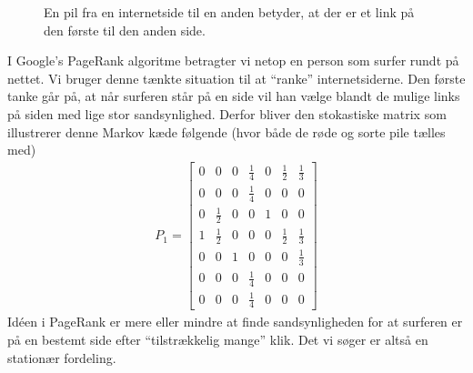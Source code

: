 \documentclass[10pt,a4paper]{article}
\begin{document}
\begin{figure}[h!]
\centering
{}
\caption{En pil fra en internetside til en anden betyder, at der er et link på den første til den anden side.}
\label{fig:links}
\end{figure}

I Google's PageRank algoritme betragter vi netop en person som surfer rundt på nettet. Vi bruger denne tænkte situation til at ``ranke'' internetsiderne. Den første tanke går på, at når surferen står på en side vil han vælge blandt de mulige links på siden med lige stor sandsynlighed. Derfor bliver den stokastiske matrix som illustrerer denne Markov kæde følgende (hvor både de røde og sorte pile tælles med)
\begin{align}\label{eq:Overgangsmatrix}
	P_1=\begin{bmatrix}
		0 & 0 & 0 & \frac{1}{4} & 0 & \frac{1}{2} & \frac{1}{3}\\
		0 & 0 & 0 & \frac{1}{4} & 0 & 0 & 0 \\
		0 & \frac{1}{2} & 0 & 0 & 1 & 0 & 0 \\
		1 & \frac{1}{2} & 0 & 0 & 0 & \frac{1}{2} & \frac{1}{3}\\
		0 & 0 & 1 & 0 & 0 & 0 & \frac{1}{3}\\
		0 & 0 & 0 & \frac{1}{4} & 0 & 0 & 0\\
		0 & 0 & 0 & \frac{1}{4} & 0 & 0 & 0
	\end{bmatrix}
\end{align}
Idéen i PageRank er mere eller mindre at finde sandsynligheden for at surferen er på en bestemt side efter ``tilstrækkelig mange'' klik. Det vi søger er altså en stationær fordeling.
\end{document}

